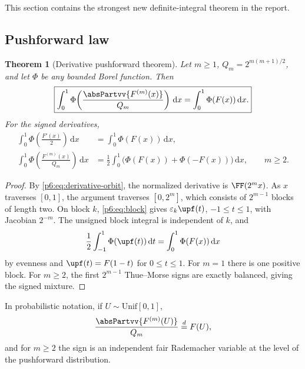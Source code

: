 \documentclass[11pt,oneside]{article}
\newtheorem{theorem}{Theorem}[section]
\theoremstyle{definition}
\theoremstyle{remark}
\newcommand{\dd}{\,\mathrm d}
\newcommand{\eps}{\varepsilon}
\newcommand{\1}{\mathbf 1}
\begin{document}
This section contains the strongest new definite-integral theorem in the report.

\subsection{Pushforward law}

\begin{theorem}[Derivative pushforward theorem]
\label{p6:thm:pushforward}
Let \(m\ge1\), \(Q_m=2^{m(m+1)/2}\), and let \(\Phi\) be any bounded Borel function.
Then
\begin{equation}
 \boxed{
 \int_0^1\Phi\!\left(\frac{\absPartvv{F^{(m)}(x)}}{Q_m}\right)\dd x
 =\int_0^1\Phi(F(x))\dd x.
 }                                                        \label{p6:eq:absolute-pushforward}
\end{equation}
For the signed derivatives,
\begin{align}
 \int_0^1\Phi\!\left(\frac{F'(x)}2\right)\dd x
 &=\int_0^1\Phi(F(x))\dd x,                              \label{p6:eq:m1-pushforward}\\
 \int_0^1\Phi\!\left(\frac{F^{(m)}(x)}{Q_m}\right)\dd x
 &=\frac12\int_0^1\bigl(\Phi(F(x))+\Phi(-F(x))\bigr)\dd x,
 \qquad m\ge2.                                           \label{p6:eq:signed-pushforward}
\end{align}
\end{theorem}

\begin{proof}
By \eqref{p6:eq:derivative-orbit}, the normalized derivative is \(\FF(2^mx)\).  As
\(x\) traverses \([0,1]\), the argument traverses \([0,2^m]\), which consists of
\(2^{m-1}\) blocks of length two.  On block \(k\), \eqref{p6:eq:block} gives
\(\eps_k\upf(t)\), \(-1\le t\le1\), with Jacobian \(2^{-m}\).  The unsigned block
integral is independent of \(k\), and
\[
 \frac12\int_{-1}^1\Phi(\upf(t))\dd t
 =\int_0^1\Phi(F(x))\dd x
\]
by evenness and \(\upf(t)=F(1-t)\) for \(0\le t\le1\).  For \(m=1\) there is one
positive block.  For \(m\ge2\), the first \(2^{m-1}\) Thue--Morse signs are exactly
balanced, giving the signed mixture.
\end{proof}

In probabilistic notation, if \(U\sim\mathrm{Unif}[0,1]\),
\begin{equation}
 \frac{\absPartvv{F^{(m)}(U)}}{Q_m}\stackrel{d}{=}F(U),            \label{p6:eq:distribution-law}
\end{equation}
and for \(m\ge2\) the sign is an independent fair Rademacher variable at the level of
the pushforward distribution.
\end{document}
